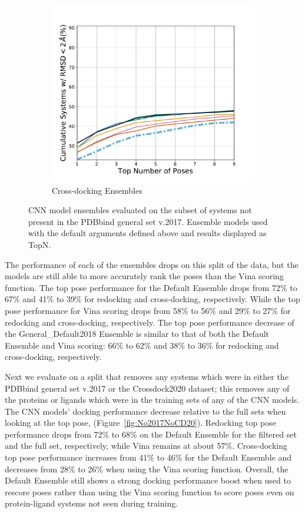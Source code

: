 \documentclass[journal=jcisd8,manuscript=article]{achemso}
\begin{document}
\begin{figure}
\begin{subfigure}[b]{0.48\textwidth}
		\includegraphics[width=\textwidth]{figures/crossdocking/ensemble_models_no2017_line.pdf}
		\caption{Cross-docking Ensembles}
        \label{fig:No2017EnsCD}
    \end{subfigure}
	\caption{CNN model ensembles evaluated on the subset of systems not present in the PDBbind general set v.2017. Ensemble models used with the default arguments defined above and results displayed as TopN.}
	\label{fig:No2017}
\end{figure}
The performance of each of the ensembles drops on this split of the data, but the models are still able to more accurately rank the poses than the Vina scoring function. The top pose performance for the Default Ensemble drops from 72\% to 67\% and 41\% to 39\% for redocking and cross-docking, respectively. While the top pose performance for Vina scoring drops from 58\% to 56\% and 29\% to 27\% for redocking and cross-docking, respectively. The top pose performance decrease of the General\_Default2018 Ensemble is similar to that of both the Default Ensemble and Vina scoring: 66\% to 62\% and 38\% to 36\% for redocking and cross-docking, respectively.

Next we evaluate on a split that removes any systems which were in either the PDBbind general set v.2017 or the Crossdock2020 dataset; this removes any of the proteins or ligands which were in the training sets of any of the CNN models. The CNN models' docking performance decrease relative to the full sets when looking at the top pose, (Figure~\ref{fig:No2017NoCD20}). Redocking top pose performance drops from 72\% to 68\% on the Default Ensemble for the filtered set and the full set, respectively, while Vina remains at about 57\%. Cross-docking top pose performance increases from 41\% to 46\% for the Default Ensemble and decreases from 28\% to 26\% when using the Vina scoring function. Overall, the Default Ensemble still shows a strong docking performance boost when used to rescore poses rather than using the Vina scoring function to score poses even on protein-ligand systems not seen during training.
\end{document}
